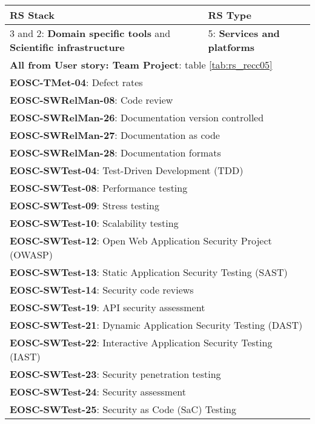 \begin{center}
  \label{tab:rs_recc08}
  \small
  \begin{tabular}{|p{0.65\linewidth}|p{0.35\linewidth}|} \hline

    \textbf{RS Stack} & \textbf{RS Type} \\ \hline  \hline
    3 and 2: \textbf{Domain specific tools} and \textbf{Scientific infrastructure} &
    5: \textbf{Services and platforms} \\ \hline \hline
    \multicolumn{2}{|l|}{\textbf{All from User story: Team Project}: table \ref{tab:rs_recc05}} \\ \hline
    \multicolumn{2}{|l|}{\textbf{EOSC-TMet-04}: Defect rates} \\ \hline
    \multicolumn{2}{|l|}{\textbf{EOSC-SWRelMan-08}: Code review} \\ \hline
    \multicolumn{2}{|l|}{\textbf{EOSC-SWRelMan-26}: Documentation version controlled} \\ \hline
    \multicolumn{2}{|l|}{\textbf{EOSC-SWRelMan-27}: Documentation as code} \\ \hline
    \multicolumn{2}{|l|}{\textbf{EOSC-SWRelMan-28}: Documentation formats} \\ \hline
    \multicolumn{2}{|l|}{\textbf{EOSC-SWTest-04}: Test-Driven Development (TDD)} \\ \hline
    \multicolumn{2}{|l|}{\textbf{EOSC-SWTest-08}: Performance testing} \\ \hline
    \multicolumn{2}{|l|}{\textbf{EOSC-SWTest-09}: Stress testing} \\ \hline
    \multicolumn{2}{|l|}{\textbf{EOSC-SWTest-10}: Scalability testing} \\ \hline
    \multicolumn{2}{|l|}{\textbf{EOSC-SWTest-12}: Open Web Application Security Project (OWASP)} \\ \hline
    \multicolumn{2}{|l|}{\textbf{EOSC-SWTest-13}: Static Application Security Testing (SAST)} \\ \hline
    \multicolumn{2}{|l|}{\textbf{EOSC-SWTest-14}: Security code reviews} \\ \hline
    \multicolumn{2}{|l|}{\textbf{EOSC-SWTest-19}: API security assessment} \\ \hline
    \multicolumn{2}{|l|}{\textbf{EOSC-SWTest-21}: Dynamic Application Security Testing (DAST)} \\ \hline
    \multicolumn{2}{|l|}{\textbf{EOSC-SWTest-22}: Interactive Application Security Testing (IAST)} \\ \hline
    \multicolumn{2}{|l|}{\textbf{EOSC-SWTest-23}: Security penetration testing} \\ \hline
    \multicolumn{2}{|l|}{\textbf{EOSC-SWTest-24}: Security assessment} \\ \hline
    \multicolumn{2}{|l|}{\textbf{EOSC-SWTest-25}: Security as Code (SaC) Testing} \\ \hline

  \end{tabular}
\end{center}


